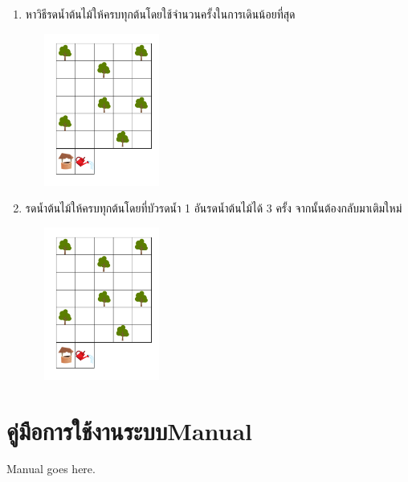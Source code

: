 \begin{enumerate}
\begin{center}
    \end{center}
    \item หาวิธีรดน้ำต้นไม้ให้ครบทุกต้นโดยใช้จำนวนครั้งในการเดินน้อยที่สุด
    \begin{center}
        \includegraphics[width=5cm, height=5cm]{pic-toro/exam/treemed.png}
    \end{center}
    \item รดน้ำต้นไม้ให้ครบทุกต้นโดยที่บัวรดน้ำ 1 อันรดน้ำต้นไม้ได้ 3 ครั้ง จากนั้นต้องกลับมาเติมใหม่
    \begin{center}
        \includegraphics[width=5cm, height=5cm]{pic-toro/exam/treehard.png}
    \end{center} 
\end{enumerate}

\chapter{\ifcpe คู่มือการใช้งานระบบ\else Manual\fi}

Manual goes here.
